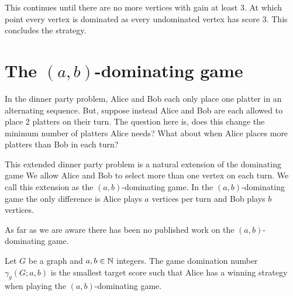 This continues until there are no more vertices with gain at least 3. At which point every vertex is dominated as every undominated vertex has score 3. This concludes the strategy.

\section{The $(a,b)$-dominating game}

In the dinner party problem, Alice and Bob each only place one platter in an alternating sequence. But, suppose instead Alice and Bob are each allowed to place 2 platters on their turn. The question here is, does this change the minimum number of platters Alice needs? What about when Alice places more platters than Bob in each turn?

This extended dinner party problem is a natural extension of the dominating game We allow Alice and Bob to select more than one vertex on each turn. We call this extension as the $(a,b)$-dominating game. In the $(a,b)$-dominating game the only difference is Alice plays $a$ vertices per turn and Bob plays $b$ vertices.

As far as we are aware there has been no published work on the $(a,b)$-dominating game. 

\begin{definition}
    Let $G$ be a graph and $a,b\in\mathbb{N}$ integers. The game domination number $\gamma_g(G;a,b)$ is the smallest target score such that Alice has a winning strategy when playing the $(a,b)$-dominating game.
\end{definition}

